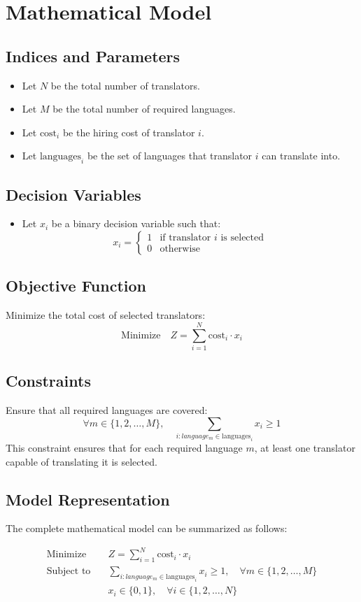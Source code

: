 \documentclass{article}
\begin{document}
\section*{Mathematical Model}

\subsection*{Indices and Parameters}
\begin{itemize}
    \item Let \( N \) be the total number of translators.
    \item Let \( M \) be the total number of required languages.
    \item Let \( \text{cost}_i \) be the hiring cost of translator \( i \).
    \item Let \( \text{languages}_i \) be the set of languages that translator \( i \) can translate into.
\end{itemize}

\subsection*{Decision Variables}
\begin{itemize}
    \item Let \( x_i \) be a binary decision variable such that:
    \[
    x_i =
    \begin{cases}
    1 & \text{if translator } i \text{ is selected} \\
    0 & \text{otherwise}
    \end{cases}
    \]
\end{itemize}

\subsection*{Objective Function}
Minimize the total cost of selected translators:
\[
\text{Minimize} \quad Z = \sum_{i=1}^{N} \text{cost}_i \cdot x_i
\]

\subsection*{Constraints}
Ensure that all required languages are covered:
\[
\forall m \in \{1, 2, \ldots, M\}, \quad \sum_{i: language_m \in \text{languages}_i} x_i \geq 1
\]
This constraint ensures that for each required language \( m \), at least one translator capable of translating it is selected.

\subsection*{Model Representation}
The complete mathematical model can be summarized as follows:

\[
\begin{align*}
\text{Minimize} \quad & Z = \sum_{i=1}^{N} \text{cost}_i \cdot x_i \\
\text{Subject to} \quad & \sum_{i: language_m \in \text{languages}_i} x_i \geq 1, \quad \forall m \in \{1, 2, \ldots, M\} \\
& x_i \in \{0, 1\}, \quad \forall i \in \{1, 2, \ldots, N\}
\end{align*}
\]
\end{document}
